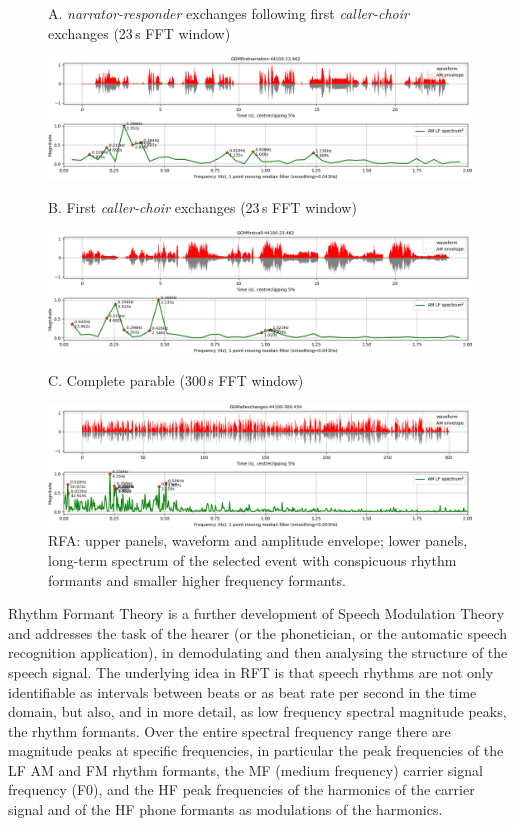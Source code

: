 \documentclass[output=paper,colorlinks,citecolor=brown]{langscibook}
\begin{document}
\begin{figure}
{\footnotesize A. \textit{narrator-responder} exchanges following first \textit{caller-choir} exchanges (23\,s FFT window)}

\includegraphics[width=\textwidth]{gibbon_figure06A.png}

{\footnotesize B. First \textit{caller-choir} exchanges (23\,s FFT window)}

\includegraphics[width=\textwidth]{gibbon_figure06B.png}

{\footnotesize C. Complete parable (300\,s FFT window)}

\includegraphics[width=\textwidth]{gibbon_figure06C.png}
\caption{\label{fig:fig06}RFA: upper panels, waveform and amplitude envelope; lower panels, long-term spectrum of the selected event with conspicuous rhythm formants and smaller higher frequency formants.}
\end{figure}

Rhythm Formant Theory is a further development of Speech Modulation Theory and addresses the task of the hearer (or the phonetician, or the automatic speech recognition application), in demodulating and then analysing the structure of the speech signal. The underlying idea in RFT \citep{gibbonsp2018, gibbonjipa2021, gibbonsp2022} is that speech rhythms are not only identifiable as intervals between beats or as beat rate per second in the time domain, but also, and in more detail, as low frequency spectral magnitude peaks, the rhythm formants. Over the entire spectral frequency range there are magnitude peaks at specific frequencies, in particular the peak frequencies of the LF AM and FM rhythm formants, the MF (medium frequency) carrier signal frequency (F0), and the HF peak frequencies of the harmonics of the carrier signal and of the HF phone formants as modulations of the harmonics.
\end{document}
